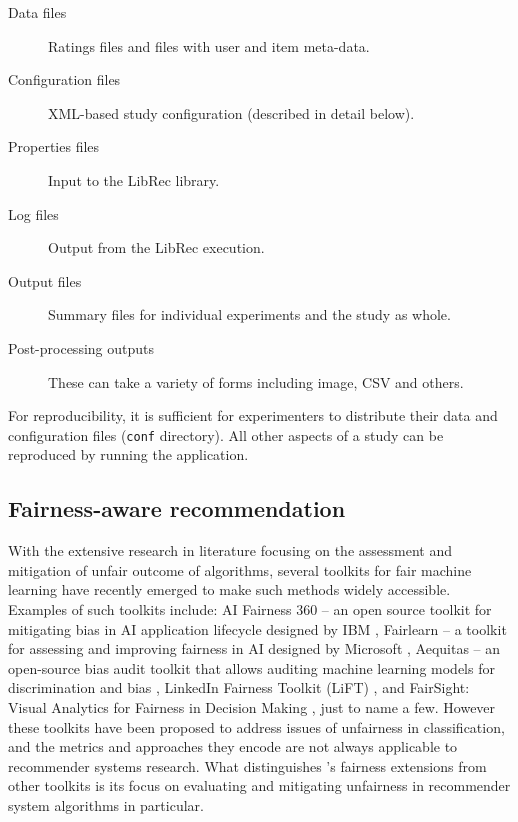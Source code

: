 \begin{description}
    \item[Data files] Ratings files and files with user and item meta-data.
    \item[Configuration files] XML-based study configuration (described in detail below).
    \item[Properties files] Input to the LibRec library.
    \item[Log files] Output from the LibRec execution.
    \item[Output files] Summary files for individual experiments and the study as whole.
    \item[Post-processing outputs] These can take a variety of forms including image, CSV and others.
\end{description}

For reproducibility, it is sufficient for experimenters to distribute their data and configuration files (\texttt{conf} directory). All other aspects of a study can be reproduced by running the \libauto{} application.

\subsection{Fairness-aware recommendation}
\label{sec:fair}
With the extensive research in literature focusing on the assessment and mitigation of unfair outcome of algorithms, several toolkits for fair machine learning have recently emerged to make such methods widely accessible. Examples of such toolkits include: AI Fairness 360 -- an open source toolkit for mitigating bias in AI application lifecycle designed by IBM \cite{bellamy2019ai}, Fairlearn -- a toolkit for assessing and improving fairness in AI designed by Microsoft \cite{bird2020fairlearn}, Aequitas -- an open-source bias audit toolkit that allows auditing machine learning models for discrimination and bias \cite{saleiro2018aequitas}, LinkedIn Fairness Toolkit (LiFT) \cite{SriramLifT2020}, and FairSight: Visual Analytics for Fairness in Decision Making \cite{ahn2019fairsight}, just to name a few.
However these toolkits have been proposed to address issues of unfairness in classification, and the metrics and approaches they encode are not always applicable to recommender systems research. What distinguishes \libauto{}'s fairness extensions from other toolkits is its focus on evaluating and mitigating unfairness in recommender system algorithms in particular.

